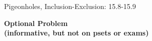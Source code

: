\documentclass[handout]{mcs}
\begin{document}

\begin{staffnotes}
Pigeonholes, Inclusion-Exclusion: 15.8-15.9
\end{staffnotes}



\begin{center}
\textbf{\large Optional Problem\\
(informative, but not on psets or exams)}
\end{center}


\end{document}
